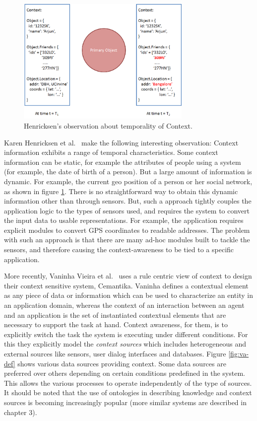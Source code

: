 \begin{figure}[t]
\centering
\includegraphics[width=0.75\textwidth]{media/chapter2/ka-obs.png}
\caption{Henricksen's observation about temporality of Context.}
\label{fig:karen-obs}
\end{figure}

Karen Henricksen et al.\ \cite{henricksen2002modeling} make the following interesting observation: Context information exhibits a range of temporal characteristics. Some context information can be static, for example the attributes of people using a system (for example, the date of birth of a person). But a large amount of information is dynamic. For example, the current geo position of a person or her social network, as shown in figure \ref{fig:karen-obs}. There is no straightforward way to obtain this dynamic information other than through sensors. But, such a approach tightly couples the application logic to the types of sensors used, and requires the system to convert the input data to usable representations. For example, the application requires explicit modules to convert GPS coordinates to readable addresses. The problem with such an approach is that there are many ad-hoc modules built to tackle the sensors, and therefore causing the context-awareness to be tied to a specific application.

More recently, Vaninha Vieira et al.\ \cite{vieira2011designing} uses a rule centric view of context to design their context sensitive system, Cemantika. Vaninha defines a contextual element as any piece of data or information which can be used to characterize an entity in an application domain, whereas the context of an interaction between an agent and an application is the set of instantiated contextual elements that are necessary to support the task at hand. Context awareness, for them, is to explicitly switch the task the system is executing under different conditions. For this they explicitly model the \textit{context sources} which includes heterogeneous and  external sources like sensors, user dialog interfaces and databases. Figure \ref{fig:va-def} shows various data sources providing context. Some data sources are preferred over others depending on certain conditions predefined in the system. This allows the various processes to operate independently of the type of sources. It should be noted that the use of ontologies in describing knowledge and context sources is becoming increasingly popular (more similar systems are described in chapter 3).

